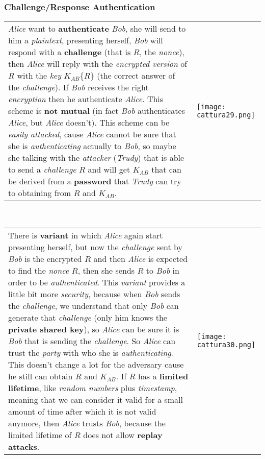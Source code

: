 \documentclass{article}
\begin{document}
\subsubsection{Challenge/Response Authentication}
\begin{tabular}{C{10cm}  L{10.5cm}}
\emph{Alice} want to \textbf{authenticate} \emph{Bob}, she will send to him a \emph{plaintext}, presenting herself, \emph{Bob} will respond with a \textbf{challenge} (that is $R$, the \emph{nonce}), then \emph{Alice} will reply with the \emph{encrypted version} of $R$ with the \emph{key} $K_{AB}\{R\}$ (the correct answer of the \emph{challenge}). If \emph{Bob} receives the right \emph{encryption} then he authenticate \emph{Alice}. This scheme is \textbf{not mutual} (in fact \emph{Bob} authenticates \emph{Alice}, but \emph{Alice} doesn't). This scheme can be \emph{easily attacked}, cause \emph{Alice} cannot be sure that she is \emph{authenticating} actually to \emph{Bob}, so maybe she talking with the \emph{attacker} (\emph{Trudy}) that is able to send a \emph{challenge} $R$ and will get $K_{AB}$ that can be derived from a \textbf{password} that \emph{Trudy} can try to obtaining from $R$ and $K_{AB}$. & \texttt{[image: cattura29.png]}
\end{tabular}
\hfill \break
\\
\begin{tabular}{C{10cm}  L{10.5cm}}
There is \textbf{variant} in which \emph{Alice} again start presenting herself, but now the \emph{challenge} sent by \emph{Bob} is the encrypted $R$ and then \emph{Alice} is expected to find the \emph{nonce} $R$, then she sends $R$ to \emph{Bob} in order to be \emph{authenticated}. This \emph{variant} provides a little bit more \emph{security}, because when \emph{Bob} sends the \emph{challenge}, we understand that only \emph{Bob} can generate that \emph{challenge} (only him knows the \textbf{private shared key}), so \emph{Alice} can be sure it is \emph{Bob} that is sending the \emph{challenge}. So \emph{Alice} can trust the \emph{party} with who she is \emph{authenticating}. This doesn't change a lot for the adversary cause he still can obtain $R$ and $K_{AB}$. If $R$ has a \textbf{limited lifetime}, like \emph{random numbers} plus \emph{timestamp}, meaning that we can consider it valid for a small amount of time after which it is not valid anymore, then \emph{Alice} trusts \emph{Bob}, because the limited lifetime of $R$ does not allow \textbf{replay attacks}. & \texttt{[image: cattura30.png]}
\end{tabular}
\end{document}
